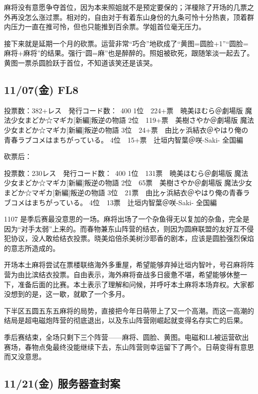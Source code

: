 麻将没有意愿争夺首位，因为本来照姐就不是预定要保的；洋榎除了开场的几票之外再没怎么涨过票。相对的，自由对于有着东山身份的九条可怜十分热衷，顶着群内压力一直在推可怜，但也只能推到百余票。学姐首位毫无压力。

接下来就是延期一个月的砍票。运营非常“巧合”地砍成了“黄图=圆脸+1”“圆脸=麻将+麻将”的结果。强行“圆=麻”也是醉醉的。照姐被砍死，跟随笨淡一起去了。黄图一票杀圆脸跃于首位，不知道该笑还是该哭。

\subsection{11/07(金) FL8}

    投票数：382+レス　発行コード数：~400
    1位　224+票　暁美ほむら＠劇場版 魔法少女まどか☆マギカ[新編]叛逆の物語
    2位　119+票　美樹さやか＠劇場版 魔法少女まどか☆マギカ[新編]叛逆の物語
    3位　24+票　由比ヶ浜結衣＠やはり俺の青春ラブコメはまちがっている。
    4位　15+票　辻垣内智葉＠咲-Saki- 全国編

砍票后：

    投票数：230レス　発行コード数：~400
    1位　131票　暁美ほむら＠劇場版 魔法少女まどか☆マギカ[新編]叛逆の物語
    2位　65票　美樹さやか＠劇場版 魔法少女まどか☆マギカ[新編]叛逆の物語
    3位　21票　由比ヶ浜結衣＠やはり俺の青春ラブコメはまちがっている。
    4位　13票　辻垣内智葉＠咲-Saki- 全国編

1107 是季后赛最没意思的一场。麻将出场了一个杂鱼得无以复加的杂鱼，完全是因为“对手太弱”上来的。而春物兼东山阵营的结衣，则因为圆麻联盟的友好互不侵犯协议，没人敢给结衣投票。晓美焰倍杀美树沙耶香的剧本，应该是圆脸强烈保焰的意志所造成的。

开场本土麻将尝试在票楼联络海外多重屋，希望能够弃掉辻垣内智叶，号召麻将阵营为由比滨结衣投票。自由表示，海外麻将奋战多日疲惫不堪，希望能够休整一下，准备后面的比赛。本土表示了理解和问候，并呼吁本土麻将本场弃权。大家都没想到的是，这一歇，就歇了一个多月。

下半区五圆五东五麻将的局势，直接把今年日萌带上了又一个高潮。而这一高潮的结局是超电磁炮阵营的彻底退出，以及东山阵营刚崛起就变得名存实亡的后果。

季后赛结束，全场只剩下三个阵营——麻将、圆脸、黄图。电磁和LL被运营砍出赛场，春物点兔最终没能继续下去，东山阵营则幸运留下了两个。日萌变得有意思而又没意思。

\subsection{11/21(金) 服务器查封案}

